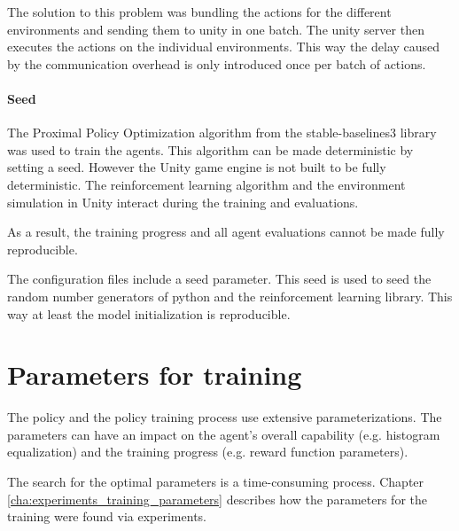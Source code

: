 The solution to this problem was bundling the actions for the different environments and sending them to unity in one batch. The unity server then executes the actions on the individual environments. This way the delay caused by the communication overhead is only introduced once per batch of actions.

\paragraph{Seed}

The Proximal Policy Optimization algorithm from the stable-baselines3 library was used to train the agents. This algorithm can be made deterministic by setting a seed. However the Unity game engine is not built to be fully deterministic. The reinforcement learning algorithm and the environment simulation in Unity interact during the training and evaluations. 

As a result, the training progress and all agent evaluations cannot be made fully reproducible.

The configuration files include a seed parameter. This seed is used to seed the random number generators of python and the reinforcement learning library. This way at least the model initialization is reproducible.

\section{Parameters for training}

The policy and the policy training process use extensive parameterizations. The parameters can have an impact on the agent's overall capability (e.g. histogram equalization) and the training progress (e.g. reward function parameters).

The search for the optimal parameters is a time-consuming process. Chapter \ref{cha:experiments_training_parameters} describes how the parameters for the training were found via experiments.

